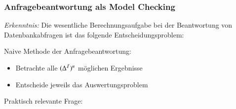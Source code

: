 \documentclass[aspectratio=1610,onlymath]{beamer}
\begin{document}
\begin{frame}\frametitle{Anfragebeantwortung als Model Checking}

\emph{Erkenntnis:} Die wesentliche Berechnungsaufgabe bei der Beantwortung von Datenbankabfragen ist das folgende Entscheidungsproblem:\bigskip

\bigskip\pause

Naive Methode der Anfragebeantwortung:
\begin{itemize}
\item Betrachte alle $(\Delta^{\mathcal{I}})^n$ möglichen Ergebnisse
\item Entscheide jeweils das Auswertungsproblem
\end{itemize}

Praktisch relevante Frage:\medskip


\end{frame}
\end{document}
